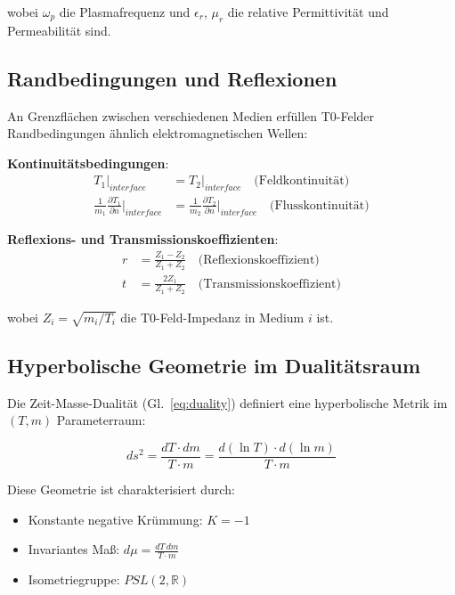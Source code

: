 \documentclass[12pt,a4paper]{article}
\begin{document}
	wobei $\omega_p$ die Plasmafrequenz und $\epsilon_r$, $\mu_r$ die relative Permittivität und Permeabilität sind.
	
	\subsection{Randbedingungen und Reflexionen}
	
	An Grenzflächen zwischen verschiedenen Medien erfüllen T0-Felder Randbedingungen ähnlich elektromagnetischen Wellen:
	
	\textbf{Kontinuitätsbedingungen}:
	\begin{align}
		T_1|_{interface} &= T_2|_{interface} \quad \text{(Feldkontinuität)} \\
		\frac{1}{m_1} \frac{\partial T_1}{\partial n}\bigg|_{interface} &= \frac{1}{m_2} \frac{\partial T_2}{\partial n}\bigg|_{interface} \quad \text{(Flusskontinuität)}
	\end{align}
	
	\textbf{Reflexions- und Transmissionskoeffizienten}:
	\begin{align}
		r &= \frac{Z_1 - Z_2}{Z_1 + Z_2} \quad \text{(Reflexionskoeffizient)} \\
		t &= \frac{2Z_1}{Z_1 + Z_2} \quad \text{(Transmissionskoeffizient)}
	\end{align}
	
	wobei $Z_i = \sqrt{m_i/T_i}$ die T0-Feld-Impedanz in Medium $i$ ist.
	
	\subsection{Hyperbolische Geometrie im Dualitätsraum}
	
	Die Zeit-Masse-Dualität (Gl.~\ref{eq:duality}) definiert eine hyperbolische Metrik im $(T,m)$ Parameterraum:
	
	\begin{equation}
		ds^2 = \frac{dT \cdot dm}{T \cdot m} = \frac{d(\ln T) \cdot d(\ln m)}{T \cdot m}
	\end{equation}
	
	Diese Geometrie ist charakterisiert durch:
	\begin{itemize}
		\item Konstante negative Krümmung: $K = -1$
		\item Invariantes Maß: $d\mu = \frac{dT \, dm}{T \cdot m}$
		\item Isometriegruppe: $PSL(2,\mathbb{R})$
	\end{itemize}
	
\end{document}
